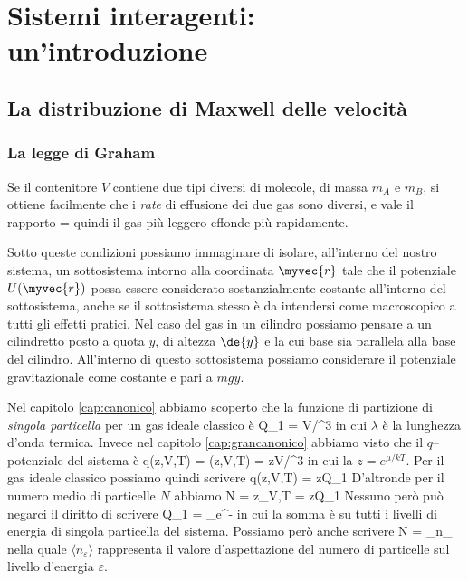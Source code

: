 \chapter{Sistemi interagenti: un'introduzione}
\label{cap:interagenti}

\section{La distribuzione di Maxwell delle velocità}


\subsection{La legge di Graham}
Se il contenitore $V$ contiene due tipi diversi di molecole, di massa $m_{A}$ e $m_{B}$, si ottiene facilmente che i {\em rate} di effusione dei due gas sono diversi, e vale il rapporto
%
\be
{} = 
\ee
%
quindi il gas più leggero effonde più rapidamente.


Sotto queste condizioni possiamo immaginare di isolare, all'interno del nostro sistema, un sottosistema intorno alla coordinata $\myvec{r}$ tale che il potenziale $U(\myvec{r})$ possa essere considerato sostanzialmente costante all'interno del sottosistema, anche se il sottosistema stesso è da intendersi come macroscopico a tutti gli effetti pratici. Nel caso del gas in un cilindro possiamo pensare a un cilindretto posto a quota $y$, di altezza $\de{y}$ e la cui base sia parallela alla base del cilindro. All'interno di questo sottosistema possiamo considerare il potenziale gravitazionale come costante e pari a $mgy$.

Nel capitolo \ref{cap:canonico} abbiamo scoperto che la funzione di partizione di {\em singola particella} per un gas ideale classico è
\be
Q_1 = V/\lambda^3
\ee
in cui $\lambda$ è la lunghezza d'onda termica. Invece nel capitolo \ref{cap:grancanonico} abbiamo visto che il $q$--potenziale del sistema è
\be
q(z,V,T) = \ln\calQ(z,V,T) = zV/\lambda^3
\ee
in cui la $z = e^{\mu/kT}$. Per il gas ideale classico possiamo quindi scrivere
\be
q(z,V,T) = zQ_1
\ee 
D'altronde per il numero medio di particelle $N$ abbiamo
\be
\label{eq:conGC0}
N = z_{V,T} = zQ_1
\ee
Nessuno però può negarci il diritto di scrivere
\be
\label{eq:conGC1}
Q_1 = \sum_\varepsilon e^{-\beta\varepsilon}
\ee
in cui la somma è su tutti i livelli di energia di singola particella del sistema. Possiamo però anche scrivere
\be
\label{eq:conGC2}
N = \sum_\varepsilon \langle n_\varepsilon\rangle
\ee
nella quale $\langle n_\varepsilon\rangle$ rappresenta il valore d'aspettazione del numero di particelle sul livello d'energia $\varepsilon$.

